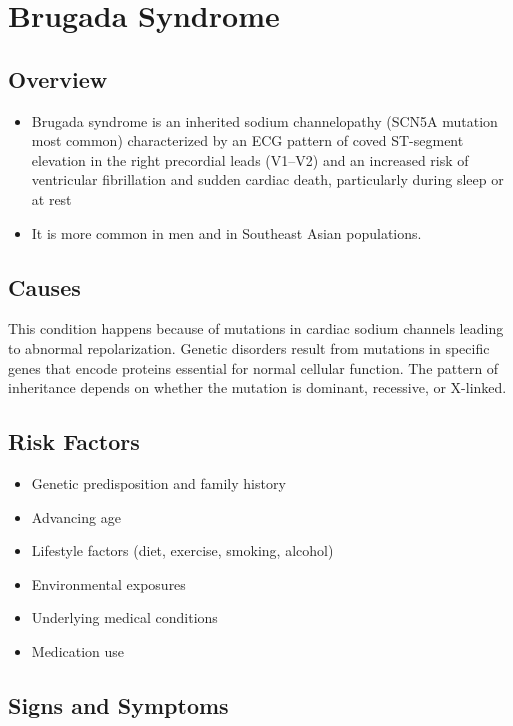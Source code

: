 \chapter{Brugada Syndrome}
\label{sec:Brugada Syndrome}

\section{Overview}


\begin{itemize}[noitemsep]
  \item Brugada syndrome is an inherited sodium channelopathy (SCN5A mutation most common) characterized by an ECG pattern of coved ST-segment elevation in the right precordial leads (V1--V2) and an increased risk of ventricular fibrillation and sudden cardiac death, particularly during sleep or at rest
  \item It is more common in men and in Southeast Asian populations.
\end{itemize}
\section{Causes}
This condition happens because of mutations in cardiac sodium channels leading to abnormal repolarization. Genetic disorders result from mutations in specific genes that encode proteins essential for normal cellular function. The pattern of inheritance depends on whether the mutation is dominant, recessive, or X-linked.   
\section{Risk Factors}

\begin{itemize}[noitemsep]
  \item Genetic predisposition and family history
  \item Advancing age
  \item Lifestyle factors (diet, exercise, smoking, alcohol)
  \item Environmental exposures
  \item Underlying medical conditions
  \item Medication use
\end{itemize}
\section{Signs and Symptoms}

